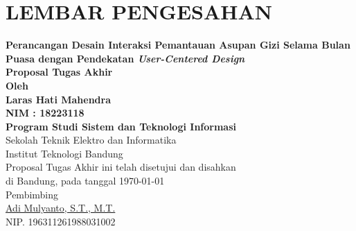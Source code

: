 \chapter*{LEMBAR PENGESAHAN}

\begin{center}
    \vspace*{0.6cm}
    {\Large\bfseries Perancangan Desain Interaksi Pemantauan Asupan Gizi Selama Bulan Puasa dengan Pendekatan \textit{User-Centered Design}}\\[0.7cm]

    {\Large\bfseries Proposal Tugas Akhir}\\[0.8cm]

    {\large\bfseries Oleh}\\[0.35cm]
    {\large\bfseries Laras Hati Mahendra}\\
    {\large\bfseries NIM : 18223118}\\[0.8cm]

    {\large\bfseries Program Studi Sistem dan Teknologi Informasi}\\
    {\large Sekolah Teknik Elektro dan Informatika}\\
    {\large Institut Teknologi Bandung}\\[0.9cm]

    Proposal Tugas Akhir ini telah disetujui dan disahkan\\
    di Bandung, pada tanggal \today\\[0.9cm]

    {\large Pembimbing}\\[4.0cm]
    {\large\underline{Adi Mulyanto, S.T., M.T.}}\\[0.2cm]
    NIP. 196311261988031002
\end{center}

\vspace{0.5cm}
\noindent



